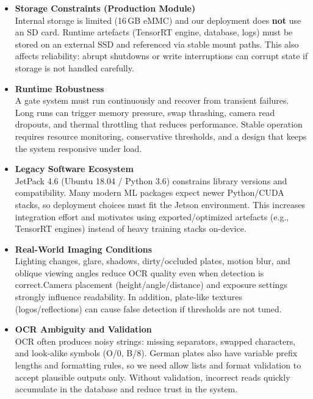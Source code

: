 \documentclass[25pt,a0paper,portrait]{tikzposter}
\begin{document}
\begin{columns}
{{\begin{itemize}
						\item \textbf{Storage Constraints (Production Module)}\\
						Internal storage is limited (16\,GB eMMC) and our deployment does \textbf{not} use an SD card. Runtime artefacts (TensorRT engine, database, logs) must be stored on an external SSD and referenced via stable mount paths. This also affects reliability: abrupt shutdowns or write interruptions can corrupt state if storage is not handled carefully.\newline
						
						\item \textbf{Runtime Robustness}\\
						A gate system must run continuously and recover from transient failures. Long runs can trigger memory pressure, swap thrashing, camera read dropouts, and thermal throttling that reduces performance. Stable operation requires resource monitoring, conservative thresholds, and a design that keeps the system responsive under load.\newline
						
						\item \textbf{Legacy Software Ecosystem}\\
						JetPack 4.6 (Ubuntu 18.04 / Python 3.6) constrains library versions and compatibility. Many modern ML packages expect newer Python/CUDA stacks, so deployment choices must fit the Jetson environment. This increases integration effort and motivates using exported/optimized artefacts (e.g., TensorRT engines) instead of heavy training stacks on-device.\newline
						
						\item \textbf{Real-World Imaging Conditions}\\
						Lighting changes, glare, shadows, dirty/occluded plates, motion blur, and oblique viewing angles reduce OCR quality even when detection is correct.\newline Camera placement (height/angle/distance) and exposure settings strongly influence readability. In addition, plate-like textures (logos/reflections) can cause false detection if thresholds are not tuned.\newline
						
						\item \textbf{OCR Ambiguity and Validation}\\
						OCR often produces noisy strings: missing separators, swapped characters, and look-alike symbols (O/0, B/8). German plates also have variable prefix lengths and formatting rules, so we need allow lists and format validation to accept plausible outputs only. Without validation, incorrect reads quickly accumulate in the database and reduce trust in the system.\newline \newline
						

\end{itemize}}}
\end{columns}
\end{document}
